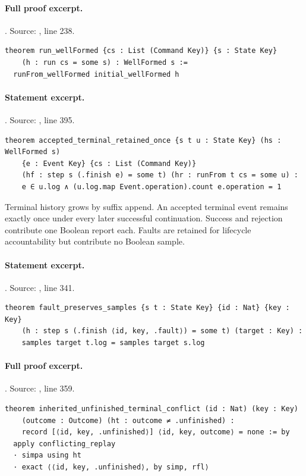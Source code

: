 \documentclass[11pt]{article}
\begin{document}
\paragraph{Full proof excerpt.}. Source: , line 238.
\begin{lstlisting}[style=AVOCSource]
theorem run_wellFormed {cs : List (Command Key)} {s : State Key}
    (h : run cs = some s) : WellFormed s :=
  runFrom_wellFormed initial_wellFormed h
\end{lstlisting}

\paragraph{Statement excerpt.}. Source: , line 395.
\begin{lstlisting}[style=AVOCSource]
theorem accepted_terminal_retained_once {s t u : State Key} (hs : WellFormed s)
    {e : Event Key} {cs : List (Command Key)}
    (hf : step s (.finish e) = some t) (hr : runFrom t cs = some u) :
    e ∈ u.log ∧ (u.log.map Event.operation).count e.operation = 1
\end{lstlisting}


Terminal history grows by suffix append. An accepted terminal event remains
exactly once under every later successful continuation. Success and rejection
contribute one Boolean report each. Faults are retained for lifecycle
accountability but contribute no Boolean sample.

\paragraph{Statement excerpt.}. Source: , line 341.
\begin{lstlisting}[style=AVOCSource]
theorem fault_preserves_samples {s t : State Key} {id : Nat} {key : Key}
    (h : step s (.finish ⟨id, key, .fault⟩) = some t) (target : Key) :
    samples target t.log = samples target s.log
\end{lstlisting}

\paragraph{Full proof excerpt.}. Source: , line 359.
\begin{lstlisting}[style=AVOCSource]
theorem inherited_unfinished_terminal_conflict (id : Nat) (key : Key)
    (outcome : Outcome) (ht : outcome ≠ .unfinished) :
    record [⟨id, key, .unfinished⟩] ⟨id, key, outcome⟩ = none := by
  apply conflicting_replay
  · simpa using ht
  · exact ⟨⟨id, key, .unfinished⟩, by simp, rfl⟩
\end{lstlisting}
\end{document}
